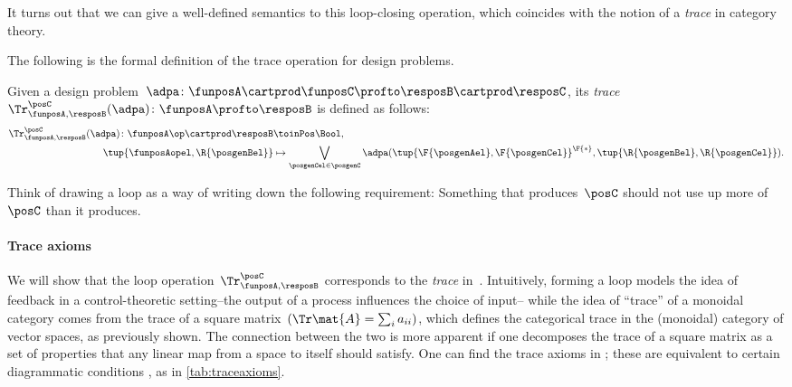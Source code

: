 It turns out that we can give a well-defined semantics to this loop-closing operation, which coincides with the notion of a \emph{trace} in category theory.

The following is the formal definition of the trace operation for design problems.

\begin{definition}
    \label{def:dp-trace}
    Given a design problem~$\adpa\colon \funposA \cartprod \funposC \profto \resposB \cartprod \resposC$, its \emph{trace}~$\Tr_{\funposA,\resposB}^\posC(\adpa) \colon \funposA \profto \resposB$ is defined as follows:
    \begin{equation}
        \label{eq:tracedef}
        \begin{aligned}
            \Tr_{\funposA,\resposB}^\posC(\adpa) \colon  \funposA\op \cartprod \resposB & \toinPos \Bool,                           \\
            \tup{\funposAopel, \R{\posgenBel}}                                         & \mapsto \bigvee_{\posgenCel \in \posgenC}
            \adpa(\tup{\F{\posgenAel}, \F{\posgenCel}}^\F{*},
            \tup{\R{\posgenBel}, \R{\posgenCel}}).
        \end{aligned}
    \end{equation}
\end{definition}

Think of drawing a loop as a way of writing down the following requirement:
Something that produces~$\posC$ should not use up more of~$\posC$ than it produces.


\paragraph{Trace axioms}
We will show that the loop operation~$\Tr_{\funposA,\resposB}^\posC$ corresponds to the \emph{trace} in~\DP.
Intuitively, forming a loop models the idea of feedback in a control-theoretic setting--the output of a process influences the choice of input--
while the idea of ``trace'' of a monoidal category comes from the trace of a square matrix~$(\Tr\mat{A} = \sum_i a_{ii})$, which defines the categorical trace in the (monoidal) category of vector spaces, as previously shown.
The connection between the two is more apparent if one decomposes the trace of a square matrix as a set of properties that any linear map from a space to itself should satisfy.
One can find the trace axioms in  \cite{mac2013categories};
these are equivalent to certain diagrammatic conditions \cite{joyal96}, as in \cref{tab:traceaxioms}.

